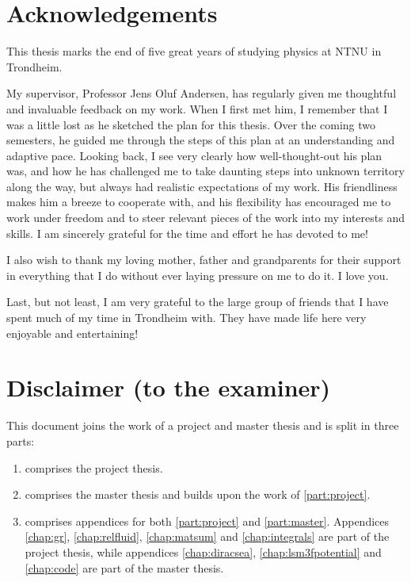 \chapter*{Acknowledgements}

This thesis marks the end of five great years of studying physics at NTNU in Trondheim.

My supervisor, Professor Jens Oluf Andersen,
has regularly given me thoughtful and invaluable feedback on my work.
When I first met him,
I remember that I was a little lost as he sketched the plan for this thesis.
Over the coming two semesters, he guided me through the steps of this plan at an understanding and adaptive pace.
Looking back, I see very clearly how well-thought-out his plan was,
and how he has challenged me to take daunting steps into unknown territory along the way,
but always had realistic expectations of my work.
His friendliness makes him a breeze to cooperate with,
and his flexibility has encouraged me to work under freedom and to steer relevant pieces of the work into my interests and skills.
I am sincerely grateful for the time and effort he has devoted to me!

I also wish to thank my loving mother, father and grandparents
for their support in everything that I do
without ever laying pressure on me to do it.
I love you.

Last, but not least, I am very grateful to the large group of friends that I have spent much of my time in Trondheim with.
They have made life here very enjoyable and entertaining!


\cleardoublepage
\chapter*{Disclaimer (to the examiner)}

This document joins the work of a project and master thesis and is split in three parts:
\begin{enumerate}
\item {} comprises the project thesis.
\item {} comprises the master thesis and builds upon the work of \cref{part:project}.
\item {} comprises appendices for both \cref{part:project} and \cref{part:master}.
      Appendices \ref{chap:gr}, \ref{chap:relfluid}, \ref{chap:matsum} and \ref{chap:integrals} are part of the project thesis,
      while appendices \ref{chap:diracsea}, \ref{chap:lsm3fpotential} and \ref{chap:code} are part of the master thesis.
\end{enumerate}

